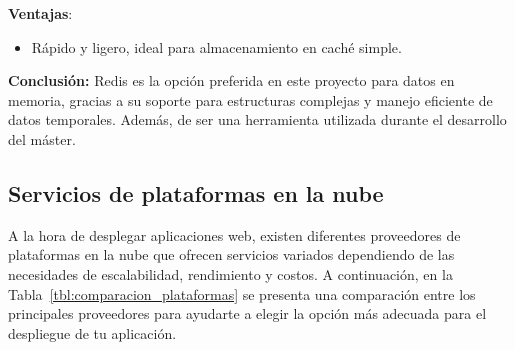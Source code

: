 \textbf{Ventajas}:
\begin{itemize}
\item Rápido y ligero, ideal para almacenamiento en caché simple.
\end{itemize}

\textbf{Conclusión:} Redis es la opción preferida en este proyecto para datos en memoria, gracias a su soporte para estructuras complejas y manejo eficiente de datos temporales. Además, de ser una herramienta utilizada durante el desarrollo del máster.

\subsection{Servicios de plataformas en la nube}

A la hora de desplegar aplicaciones web, existen diferentes proveedores de plataformas en la nube que ofrecen servicios variados dependiendo de las necesidades de escalabilidad, rendimiento y costos. A continuación, en la Tabla~\ref{tbl:comparacion_plataformas} se presenta una comparación entre los principales proveedores para ayudarte a elegir la opción más adecuada para el despliegue de tu aplicación.


\begin{table}[h!tb] 
    \centering
    \caption{Comparación de Plataformas para Despliegue de Aplicaciones}
    \label{tbl:comparacion_plataformas}
\end{table}


